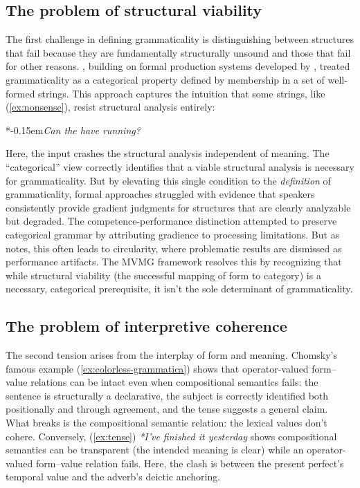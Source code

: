 \documentclass[12pt,letterpaper]{article}
\newcommand{\mention}[1]{\textit{#1}}
\newcommand{\judgesep}{\kern-0.15em}
\newcommand{\ungram}[1]{*\judgesep#1}
\begin{document}
\subsection{The problem of structural viability}\label{sec:impasse-viability}

The first challenge in defining grammaticality is distinguishing between structures that fail because they are fundamentally structurally unsound and those that fail for other reasons. \textcite{chomsky1957}, building on formal production systems developed by \textcite{post1943}, treated grammaticality as a categorical property defined by membership in a set of well-formed strings. This approach captures the intuition that some strings, like (\ref{ex:nonsense}), resist structural analysis entirely:

\ea
\ungram{\mention{Can the have running?}}
\z

Here, the input crashes the structural analysis independent of meaning. The \enquote{categorical} view correctly identifies that a viable structural analysis is necessary for grammaticality. But by elevating this single condition to the \emph{definition} of grammaticality, formal approaches struggled with evidence that speakers consistently provide gradient judgments for structures that are clearly analyzable but degraded. The competence-performance distinction \autocite{chomsky1965} attempted to preserve categorical grammar by attributing gradience to processing limitations. But as \textcite[71]{schutze2016} notes, this often leads to circularity, where problematic results are dismissed as performance artifacts. The MVMG framework resolves this by recognizing that while structural viability (the successful mapping of form to category) is a necessary, categorical prerequisite, it isn't the sole determinant of grammaticality.

\subsection{The problem of interpretive coherence}\label{sec:impasse-coherence}

The second tension arises from the interplay of form and meaning. Chomsky's famous example (\ref{ex:colorless-grammatica}) shows that operator-valued form--value relations can be intact even when compositional semantics fails: the sentence is structurally a declarative, the subject is correctly identified both positionally and through agreement, and the tense suggests a general claim. What breaks is the compositional semantic relation: the lexical values don't cohere. Conversely, (\ref{ex:tense}) \textit{*I've finished it yesterday} shows compositional semantics can be transparent (the intended meaning is clear) while an operator-valued form--value relation fails. Here, the clash is between the present perfect's temporal value and the adverb's deictic anchoring.
\end{document}
